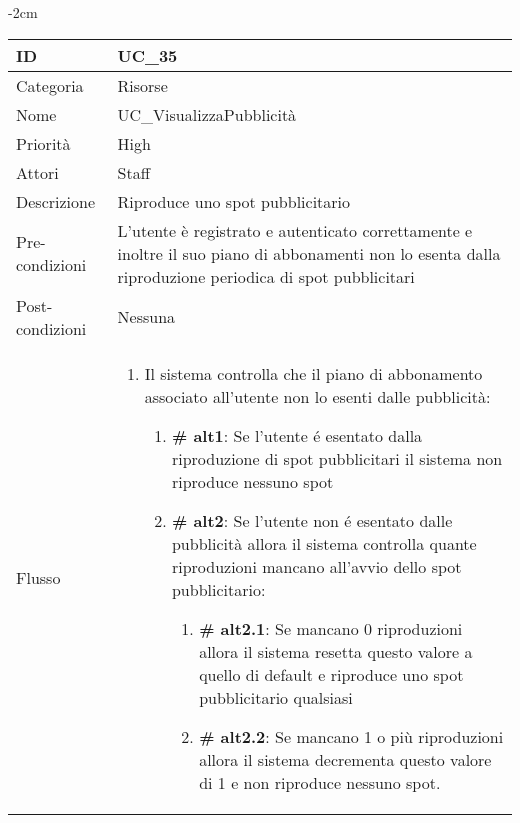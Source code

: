 \begin{center}
\begin{table}[bp]
    \centering
    \addtolength{\leftskip} {-2cm}
\begin{tabular}{ |p{2.6cm}|p{13cm}|  }
\hline
ID & UC\_35 \\\hline
Categoria & Risorse \\\hline
Nome & UC\_VisualizzaPubblicità\\\hline
Priorità & High \\\hline
Attori &  Staff \\\hline
Descrizione & Riproduce uno spot pubblicitario\\\hline
Pre-condizioni & L'utente è registrato e autenticato correttamente e inoltre il suo piano di abbonamenti non lo esenta dalla riproduzione periodica di spot pubblicitari\\\hline
Post-condizioni & Nessuna\\\hline
Flusso &  	\vspace{-5mm} \begin{enumerate}
		\item Il sistema controlla che il piano di abbonamento associato all'utente non lo esenti dalle pubblicità:
		 \begin{enumerate}[label*=\arabic*.]
			\item \textbf{\# alt1}: Se l'utente \'e esentato dalla riproduzione di spot pubblicitari il sistema non riproduce nessuno spot
			\item \textbf{\# alt2}: Se l'utente non \'e esentato dalle pubblicità allora il sistema controlla quante riproduzioni mancano all'avvio dello spot pubblicitario:
			 \begin{enumerate}[label*=\arabic*.]
				\item \textbf{\# alt2.1}: Se mancano 0 riproduzioni allora il sistema resetta questo valore a quello di default e riproduce uno spot pubblicitario qualsiasi
				\item \textbf{\# alt2.2}: Se mancano 1 o più riproduzioni allora il sistema decrementa questo valore di 1 e non riproduce nessuno spot.
			\end{enumerate}
					\end{enumerate}

		\end{enumerate}\\\hline
\end{tabular}
\label{table_use_case:35}\newline
\end{table}


\end{center}
